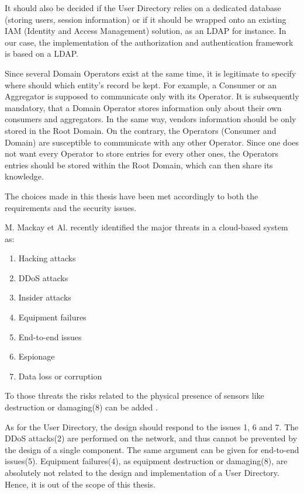 It should also be decided if the User Directory relies on a dedicated database (storing users, session information) or if it should be wrapped onto an existing IAM (Identity and Access Management) solution, as an LDAP for instance. In our case, the implementation of the authorization and authentication framework is based on a LDAP.

Since several Domain Operators exist at the same time, it is legitimate to specify where should which entity's record be kept. For example, a Consumer or an Aggregator is supposed to communicate only with its Operator. It is subsequently mandatory, that a Domain Operator stores information only about their own consumers and aggregators. In the same way, vendors information should be only stored in the Root Domain. On the contrary, the Operators (Consumer and Domain) are susceptible to communicate with any other Operator. Since one does not want every Operator to store entries for every other ones, the Operators entries should be stored within the Root Domain, which can then share its knowledge. 

The choices made in this thesis have been met accordingly to both the requirements and the security issues.

M. Mackay et Al. recently identified the major threats in a cloud-based system as\cite{Mackay2012}: 
\begin{enumerate}
	\item Hacking attacks
	\item DDoS attacks
	\item Insider attacks
	\item Equipment failures
	\item End-to-end issues
	\item Espionage
	\item Data loss or corruption
\end{enumerate}

To those threats the risks related to the physical presence of sensors like destruction or damaging(8) can be added .

As for the User Directory, the design should respond to the issues 1, 6 and 7. The DDoS attacks(2) are performed on the network, and thus cannot be prevented by the design of a single component. The same argument can be given for end-to-end issues(5). Equipment failures(4), as equipment destruction or damaging(8), are absolutely not related to the design and implementation of a User Directory. Hence, it is out of the scope of this thesis. 

